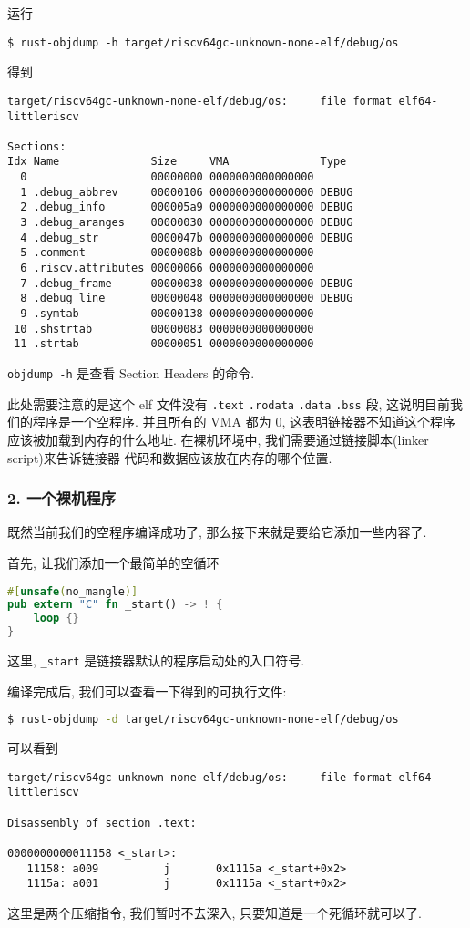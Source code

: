 \documentclass[a4paper]{ctexart}
\begin{document}
运行
\begin{lstlisting}
$ rust-objdump -h target/riscv64gc-unknown-none-elf/debug/os
\end{lstlisting}
得到
\begin{lstlisting}
target/riscv64gc-unknown-none-elf/debug/os:     file format elf64-littleriscv

Sections:
Idx Name              Size     VMA              Type
  0                   00000000 0000000000000000
  1 .debug_abbrev     00000106 0000000000000000 DEBUG
  2 .debug_info       000005a9 0000000000000000 DEBUG
  3 .debug_aranges    00000030 0000000000000000 DEBUG
  4 .debug_str        0000047b 0000000000000000 DEBUG
  5 .comment          0000008b 0000000000000000
  6 .riscv.attributes 00000066 0000000000000000
  7 .debug_frame      00000038 0000000000000000 DEBUG
  8 .debug_line       00000048 0000000000000000 DEBUG
  9 .symtab           00000138 0000000000000000
 10 .shstrtab         00000083 0000000000000000
 11 .strtab           00000051 0000000000000000
\end{lstlisting}
\verb|objdump -h| 是查看 Section Headers 的命令.

此处需要注意的是这个 elf 文件没有
\verb|.text| \verb|.rodata| \verb|.data| \verb|.bss| 段,
这说明目前我们的程序是一个空程序.
并且所有的 VMA 都为 0,
这表明链接器不知道这个程序应该被加载到内存的什么地址.
在裸机环境中, 我们需要通过链接脚本(linker script)来告诉链接器
代码和数据应该放在内存的哪个位置.

\subsubsection{2. 一个裸机程序}

既然当前我们的空程序编译成功了,
那么接下来就是要给它添加一些内容了.

首先, 让我们添加一个最简单的空循环
\begin{lstlisting}[language=rust]
#[unsafe(no_mangle)]
pub extern "C" fn _start() -> ! {
    loop {}
}
\end{lstlisting}
这里, \verb|_start|
是链接器默认的程序启动处的入口符号.

编译完成后, 我们可以查看一下得到的可执行文件:
\begin{lstlisting}[language=bash]
$ rust-objdump -d target/riscv64gc-unknown-none-elf/debug/os
\end{lstlisting}
可以看到
\begin{lstlisting}
target/riscv64gc-unknown-none-elf/debug/os:     file format elf64-littleriscv

Disassembly of section .text:

0000000000011158 <_start>:
   11158: a009          j       0x1115a <_start+0x2>
   1115a: a001          j       0x1115a <_start+0x2>
\end{lstlisting}
这里是两个压缩指令, 我们暂时不去深入,
只要知道是一个死循环就可以了.
\end{document}
